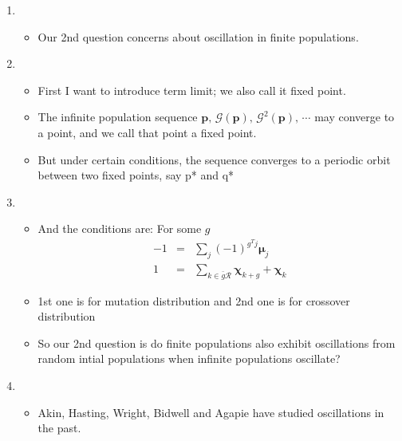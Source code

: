 \documentclass{article}
\begin{document}
\begin{enumerate}
\item 
  \begin{itemize}
  \item Our 2nd question concerns about oscillation in
    finite populations.
  \end{itemize}
    
\item
  \begin{itemize}
  \item First I want to introduce term limit; we also call it fixed
    point.
  \item The infinite population sequence  $\bm{p}, \, \mathcal{G}(\bm{p}), \, {\mathcal{G}}^2(\bm{p}), \, \cdots$ may
    converge to a point, and we call that point a fixed point.
  \item But under certain conditions, the sequence converges to a
    periodic orbit between two fixed points, say p* and q*
\end{itemize}

\item
  \begin{itemize}
  \item And the conditions are: For some $g$
  \begin{eqnarray*}
      -1 &=& \sum \limits_{j} (-1)^{g^T j} \bm{\mu}_j \\
      1 &=& \sum \limits_{k \in \bar{g}\mathcal{R}} \bm{\chi}_{k+g} + \bm{\chi}_k 
      \end{eqnarray*}
  \item 1st one is for mutation distribution and 2nd one is for crossover distribution
  \item So our 2nd question is do finite populations also exhibit
     oscillations from random intial populations when infinite populations oscillate?
  \end{itemize}
    
\item
  \begin{itemize}
    \item Akin, Hasting, Wright, Bidwell and Agapie have studied oscillations in the past.
  \end{itemize}


\end{enumerate}
\end{document}
